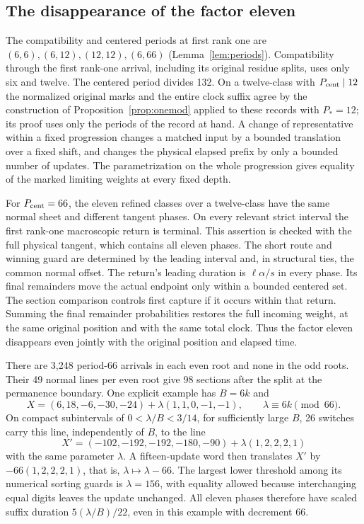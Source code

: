 \documentclass[11pt,reqno]{amsart}
\theoremstyle{definition}
\begin{document}
\subsection{The disappearance of the factor eleven}\label{sec:eleven}
The compatibility and centered periods at first rank one are
\((6,6),(6,12),(12,12),(6,66)\)
(Lemma~\ref{lem:periods}). Compatibility through the first rank-one
arrival, including its original residue splits, uses only six and
twelve. The centered period divides 132. On a twelve-class with
\(P_{\rm cent}\mid12\) the normalized original marks and the entire
clock suffix agree by the construction of Proposition~\ref{prop:onemod} applied to
these records with \(P_*=12\); its proof uses only the periods of the record
at hand. A change of
representative within a fixed progression changes a matched input
by a bounded translation over a fixed shift, and changes the
physical elapsed prefix by only a bounded number of updates.
The parametrization on the whole progression gives equality of
the marked limiting weights at every fixed depth.

For \(P_{\rm cent}=66\), the eleven refined classes over a twelve-class
have the same normal sheet and different tangent phases. On every
relevant strict interval the first rank-one macroscopic return is
terminal. This assertion is checked with the full physical tangent,
which contains all eleven phases. The short route and winning guard
are determined by the leading interval and, in structural ties,
the common normal offset. The return's leading duration is
\(\ell\alpha/s\) in every phase. Its final remainders move the actual
endpoint only within a bounded centered set. The section comparison
controls first capture if it occurs within that return. Summing
the final remainder probabilities restores the full incoming
weight, at the same original position and with the same total
clock. Thus the factor eleven disappears even jointly with the
original position and elapsed time.

There are 3,248 period-66 arrivals in each even root and none in the
odd roots. Their 49 normal lines per even root give 98 sections
after the split at the permanence boundary. One explicit example
has \(B=6k\) and
\[
 X=(6,18,-6,-30,-24)+\lambda(1,1,0,-1,-1),\qquad \lambda\equiv6k\pmod{66}.
\]
On compact subintervals of \(0<\lambda/B<3/14\), for sufficiently
large \(B\), 26 switches carry this line, independently of \(B\), to the
line
\[
 X'=(-102,-192,-192,-180,-90)+\lambda(1,2,2,2,1)
\]
with the same parameter \(\lambda\). A fifteen-update word then
translates \(X'\) by \(-66(1,2,2,2,1)\), that is,
\(\lambda\mapsto\lambda-66\). The largest lower threshold among its
numerical sorting guards is \(\lambda=156\), with equality allowed
because interchanging equal digits leaves the update unchanged.
All eleven phases therefore have scaled suffix duration
\(5(\lambda/B)/22\), even in this example with decrement 66.
\end{document}
